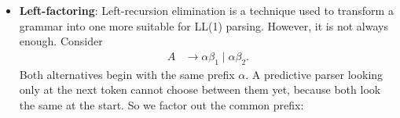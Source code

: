 \documentclass{report}
\begin{document}
\begin{itemize}
            \begin{align*}
                E &\to E + T \ \mid \ E - T \ \mid \ T
            .\end{align*}
            Notice that $\beta = T$, $\alpha_{1} = +T$, and $\alpha_{2} = -T$. Thus, the production rule becomes
            \begin{align*}
                E &\to TE^{\prime} \\
                E^{\prime} &\to +TE^{\prime} \ \mid \ -TE^{\prime} \ \mid \ \varepsilon
            .\end{align*}
            Notice that they both produce derivations of the form
            \begin{align*}
                T(+T \ \mid \ -T)^{*}
            .\end{align*}
            The full grammar would be converted to
            \begin{align*}
                E &\to TE^{\prime} \\
                E^{\prime} &\to +TE^{\prime} \ \mid \ -TE^{\prime} \ \mid \ \varepsilon \\
                T &\to NT^{\prime} \\
                T^{\prime} &\to *NT^{\prime} \ \mid \ /NT^{\prime} \ \mid \ \text{ MOD } NT^{\prime} \ \mid \ \varepsilon \\
                N &\to +N \ \mid \ -N \ \mid \ F \\
                F &\to SF^{\prime} \\
                F^{\prime} &\to \land SF^{\prime} \ \mid \ \varepsilon\\
                S &\to (E) \ \mid \ \text{int} \ \mid \ \text{var}
            .\end{align*}
            Notice that the rules that are not left recursive can remain the same.
        \item \textbf{Left-factoring}: Left-recursion elimination is a technique used to transform a grammar into one more suitable for LL(1) parsing. However, it is not always enough. Consider 
            \begin{align*}
                A &\to \alpha\beta_{1} \mid \alpha\beta_{2} 
            .\end{align*}
            Both alternatives begin with the same prefix $\alpha$. A predictive parser looking only at the next token cannot choose between them yet, because both look the same at the start. So we factor out the common prefix:
            \begin{align*}

\end{align*}
\end{itemize}
\end{document}
